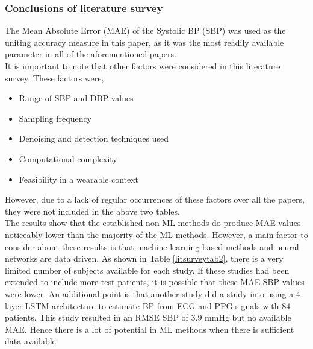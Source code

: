 \subsubsection{Conclusions of literature survey}

The Mean Absolute Error (MAE) of the Systolic BP (SBP) was used as the uniting accuracy measure in this paper, as it was the most readily available parameter in all of the aforementioned papers. \\ \newline \noindent It is important to note that other factors were considered in this literature survey. These factors were, \begin{itemize}
    \item Range of SBP and DBP values 
    \item Sampling frequency
    \item Denoising and detection techniques used
    \item Computational complexity
    \item Feasibility in a wearable context
\end{itemize}\noindent However, due to a lack of regular occurrences of these factors over all the papers, they were not included in the above two tables.\\ \newline \noindent The results show that the established non-ML methods do produce MAE values noticeably lower than the majority of the ML methods. However, a main factor to consider about these results is that machine learning based methods and neural networks are data driven. As shown in Table \ref{litsurveytab2}, there is a very limited number of subjects available for each study. If these studies had been extended to include more test patients, it is possible that these MAE SBP values were lower. An additional point is that another study \cite{Su2017} did a study into using a 4-layer LSTM architecture to estimate BP from ECG and PPG signals with 84 patients. This study resulted in an RMSE SBP of $3.9$ mmHg but no available MAE. Hence there is a lot of potential in ML methods when there is sufficient data available.